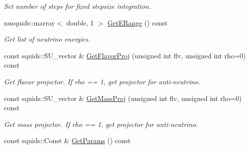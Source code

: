 \begin{DoxyCompactItemize}
\begin{DoxyCompactList}\small\item\em Set number of steps for fixed stepsize integration. \end{DoxyCompactList}\item 
nusquids\+::marray$<$ double, 1 $>$ \hyperlink{structcudanusquids_1_1ParameterObject_a48a9fd35978c1b73b13640a4ca51a107}{Get\+E\+Range} () const \hypertarget{structcudanusquids_1_1ParameterObject_a48a9fd35978c1b73b13640a4ca51a107}{}\label{structcudanusquids_1_1ParameterObject_a48a9fd35978c1b73b13640a4ca51a107}

\begin{DoxyCompactList}\small\item\em Get list of neutrino energies. \end{DoxyCompactList}\item 
const squids\+::\+S\+U\+\_\+vector \& \hyperlink{structcudanusquids_1_1ParameterObject_a9f2a23a88fe5e1300f2a44c8d4f90b48}{Get\+Flavor\+Proj} (unsigned int flv, unsigned int rho=0) const \hypertarget{structcudanusquids_1_1ParameterObject_a9f2a23a88fe5e1300f2a44c8d4f90b48}{}\label{structcudanusquids_1_1ParameterObject_a9f2a23a88fe5e1300f2a44c8d4f90b48}

\begin{DoxyCompactList}\small\item\em Get flavor projector. If rho == 1, get projector for anti-\/neutrino. \end{DoxyCompactList}\item 
const squids\+::\+S\+U\+\_\+vector \& \hyperlink{structcudanusquids_1_1ParameterObject_a6bddcbf30af44496c494233dea041628}{Get\+Mass\+Proj} (unsigned int flv, unsigned int rho=0) const \hypertarget{structcudanusquids_1_1ParameterObject_a6bddcbf30af44496c494233dea041628}{}\label{structcudanusquids_1_1ParameterObject_a6bddcbf30af44496c494233dea041628}

\begin{DoxyCompactList}\small\item\em Get mass projector. If rho == 1, get projector for anti-\/neutrino. \end{DoxyCompactList}\item 
const squids\+::\+Const \& \hyperlink{structcudanusquids_1_1ParameterObject_ab70411a4435ae82bc49adcd808572f96}{Get\+Params} () const \hypertarget{structcudanusquids_1_1ParameterObject_ab70411a4435ae82bc49adcd808572f96}{}\label{structcudanusquids_1_1ParameterObject_ab70411a4435ae82bc49adcd808572f96}


\end{DoxyCompactItemize}
